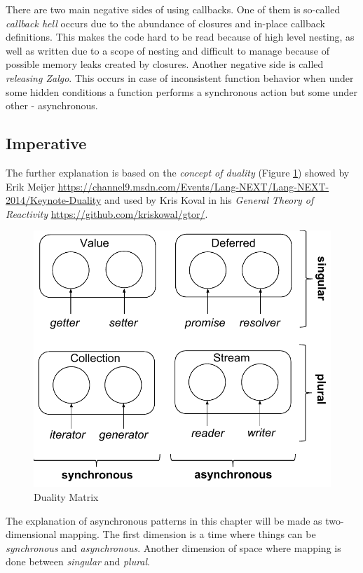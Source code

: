 There are two main negative sides of using callbacks. One of them is so-called \textit{callback hell} occurs due to the abundance of closures and in-place callback definitions. This makes the code hard to be read because of high level nesting, as well as written due to a scope of nesting and difficult to manage because of possible memory leaks created by closures. Another negative side is called \textit{releasing Zalgo}\cite{zalgo}. This occurs in case of inconsistent function behavior when under some hidden conditions a function performs a synchronous action but some under other - asynchronous.

\subsection{Imperative}
The further explanation is based on the \textit{concept of duality} (Figure \ref{fig:dualityMatrix}) showed by Erik Meijer \url{https://channel9.msdn.com/Events/Lang-NEXT/Lang-NEXT-2014/Keynote-Duality} and used by Kris Koval \cite{gtor} in his \textit{General Theory of Reactivity} \url{https://github.com/kriskowal/gtor/}.

\begin{figure}[ht]
	\label{fig:dualityMatrix}
	\centering
	\includegraphics[scale = 0.5]{grafiken/dualityMatrix}
	\caption{Duality Matrix \cite{gtor}}
\end{figure}

The explanation of asynchronous patterns in this chapter will be made as two-dimensional mapping. The first dimension is a time where things can be \textit{synchronous} and \textit{asynchronous}. Another dimension of space where mapping is done between \textit{singular} and \textit{plural}.

